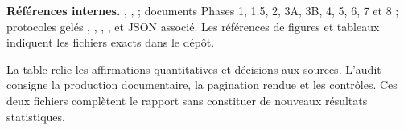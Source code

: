 \textbf{Références internes.} , ,  ; documents Phases 1, 1.5, 2, 3A, 3B, 4, 5, 6, 7 et 8 ; protocoles gelés , , , ,  et JSON associé. Les références de figures et tableaux indiquent les fichiers exacts dans le dépôt.



La table  relie les affirmations quantitatives et décisions aux sources. L’audit  consigne la production documentaire, la pagination rendue et les contrôles. Ces deux fichiers complètent le rapport sans constituer de nouveaux résultats statistiques.

